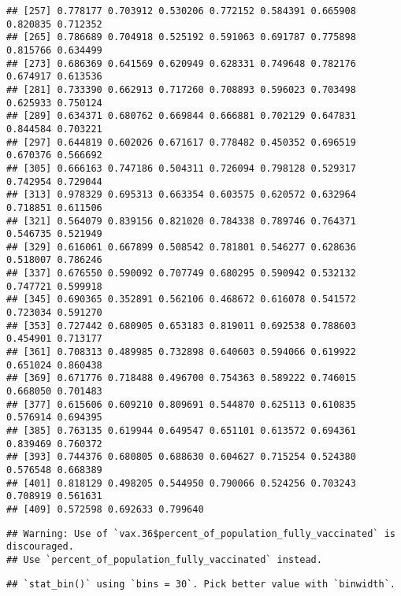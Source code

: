 \documentclass[
]{article}
\newenvironment{Shaded}{\begin{snugshade}}{\end{snugshade}}
\newcommand{\FloatTok}[1]{\textcolor[rgb]{0.00,0.00,0.81}{#1}}
\newcommand{\FunctionTok}[1]{\textcolor[rgb]{0.00,0.00,0.00}{#1}}
\newcommand{\NormalTok}[1]{#1}
\newcommand{\SpecialCharTok}[1]{\textcolor[rgb]{0.00,0.00,0.00}{#1}}
\begin{document}
\begin{verbatim}
## [257] 0.778177 0.703912 0.530206 0.772152 0.584391 0.665908 0.820835 0.712352
## [265] 0.786689 0.704918 0.525192 0.591063 0.691787 0.775898 0.815766 0.634499
## [273] 0.686369 0.641569 0.620949 0.628331 0.749648 0.782176 0.674917 0.613536
## [281] 0.733390 0.662913 0.717260 0.708893 0.596023 0.703498 0.625933 0.750124
## [289] 0.634371 0.680762 0.669844 0.666881 0.702129 0.647831 0.844584 0.703221
## [297] 0.644819 0.602026 0.671617 0.778482 0.450352 0.696519 0.670376 0.566692
## [305] 0.666163 0.747186 0.504311 0.726094 0.798128 0.529317 0.742954 0.729044
## [313] 0.978329 0.695313 0.663354 0.603575 0.620572 0.632964 0.718851 0.611506
## [321] 0.564079 0.839156 0.821020 0.784338 0.789746 0.764371 0.546735 0.521949
## [329] 0.616061 0.667899 0.508542 0.781801 0.546277 0.628636 0.518007 0.786246
## [337] 0.676550 0.590092 0.707749 0.680295 0.590942 0.532132 0.747721 0.599918
## [345] 0.690365 0.352891 0.562106 0.468672 0.616078 0.541572 0.723034 0.591270
## [353] 0.727442 0.680905 0.653183 0.819011 0.692538 0.788603 0.454901 0.713177
## [361] 0.708313 0.489985 0.732898 0.640603 0.594066 0.619922 0.651024 0.860438
## [369] 0.671776 0.718488 0.496700 0.754363 0.589222 0.746015 0.668050 0.701483
## [377] 0.615606 0.609210 0.809691 0.544870 0.625113 0.610835 0.576914 0.694395
## [385] 0.763135 0.619944 0.649547 0.651101 0.613572 0.694361 0.839469 0.760372
## [393] 0.744376 0.680805 0.688630 0.604627 0.715254 0.524380 0.576548 0.668389
## [401] 0.818129 0.498205 0.544950 0.790066 0.524256 0.703243 0.708919 0.561631
## [409] 0.572598 0.692633 0.799640
\end{verbatim}

\begin{Shaded}
\end{Shaded}

\begin{verbatim}
## Warning: Use of `vax.36$percent_of_population_fully_vaccinated` is discouraged.
## Use `percent_of_population_fully_vaccinated` instead.
\end{verbatim}

\begin{verbatim}
## `stat_bin()` using `bins = 30`. Pick better value with `binwidth`.
\end{verbatim}
\end{document}
